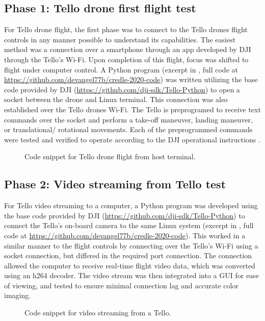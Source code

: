 \subsection{Phase 1: Tello drone first flight test}
For Tello drone flight, the first phase was to connect to the Tello drones flight controls in any manner possible to understand its capabilities. The easiest method was a connection over a smartphone through an app developed by DJI through the Tello’s Wi-Fi. Upon completion of this flight, focus was shifted to flight under computer control. A Python program (excerpt in , full code at \url{https://github.com/devangel77b/credle-2020-code}) was written utilizing the base code provided by DJI (\url{https://github.com/dji-sdk/Tello-Python}) to open a socket between the drone and Linux terminal. This connection was also established over the Tello drones Wi-Fi. The Tello is preprogramed to receive text commands over the socket and perform a take-off maneuver, landing maneuver, or translational/ rotational movements. Each of the preprogrammed commands were tested and verified to operate according to the DJI operational instructions \cite{tello-manual}.
\begin{figure}
\caption{Code snippet for Tello drone flight from host terminal.}
\label{fig:pseudocode1}

\end{figure}






\subsection{Phase 2: Video streaming from Tello test}
For Tello video streaming to a computer, a Python program was developed using the base code provided by DJI (\url{https://github.com/dji-sdk/Tello-Python}) to connect the Tello’s on-board camera to the same Linux system (excerpt in , full code at \url{https://github.com/devangel77b/credle-2020-code}). This worked in a similar manner to the flight controls by connecting over the Tello’s Wi-Fi using a socket connection, but differed in the required port connection. The connection allowed the computer to receive real-time flight video data, which was converted using an h264 decoder. The video stream was then integrated into a GUI for ease of viewing, and tested to ensure minimal connection lag and accurate color imaging.
\begin{figure}
\caption{Code snippet for video streaming from a Tello.}
\label{fig:pseudocode2}

\end{figure}





